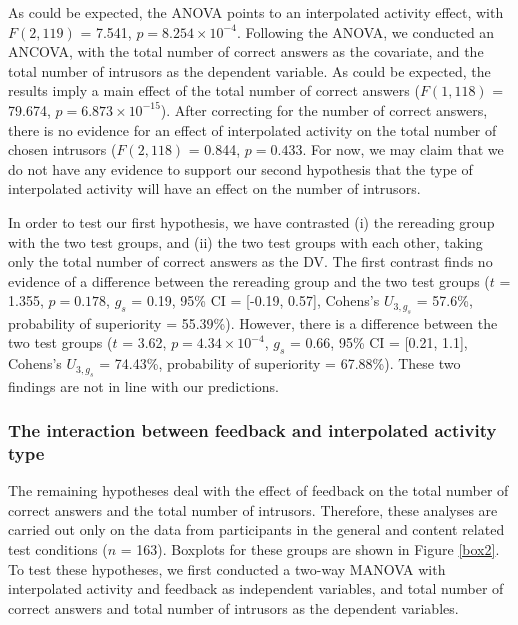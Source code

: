 \documentclass[11pt,]{article}
\begin{document}
As could be expected, the ANOVA points to an interpolated activity
effect, with \(F(2, 119)\) = 7.541, \(p = 8.254\times 10^{-4}\).
Following the ANOVA, we conducted an ANCOVA, with the total number of
correct answers as the covariate, and the total number of intrusors as
the dependent variable. As could be expected, the results imply a main
effect of the total number of correct answers (\(F(1, 118)\) = 79.674,
\(p = 6.873\times 10^{-15}\)). After correcting for the number of
correct answers, there is no evidence for an effect of interpolated
activity on the total number of chosen intrusors (\(F (2, 118)\) =
0.844, \(p = 0.433\). For now, we may claim that we do not have any
evidence to support our second hypothesis that the type of interpolated
activity will have an effect on the number of intrusors.

In order to test our first hypothesis, we have contrasted (i) the
rereading group with the two test groups, and (ii) the two test groups
with each other, taking only the total number of correct answers as the
DV. The first contrast finds no evidence of a difference between the
rereading group and the two test groups (\(t\) = 1.355, \(p = 0.178\),
\(g_s\) = 0.19, 95\% CI = {[}-0.19, 0.57{]}, Cohens's \(U_{3, g_s}\) =
57.6\%, probability of superiority = 55.39\%). However, there is a
difference between the two test groups (\(t\) = 3.62,
\(p = 4.34\times 10^{-4}\), \(g_s\) = 0.66, 95\% CI = {[}0.21, 1.1{]},
Cohens's \(U_{3, g_s}\) = 74.43\%, probability of superiority =
67.88\%). These two findings are not in line with our predictions.

\hypertarget{the-interaction-between-feedback-and-interpolated-activity-type}{%
\subsubsection{The interaction between feedback and interpolated
activity
type}\label{the-interaction-between-feedback-and-interpolated-activity-type}}

The remaining hypotheses deal with the effect of feedback on the total
number of correct answers and the total number of intrusors. Therefore,
these analyses are carried out only on the data from participants in the
general and content related test conditions (\(n\) = 163). Boxplots for
these groups are shown in Figure \ref{box2}. To test these hypotheses,
we first conducted a two-way MANOVA with interpolated activity and
feedback as independent variables, and total number of correct answers
and total number of intrusors as the dependent variables.
\end{document}
